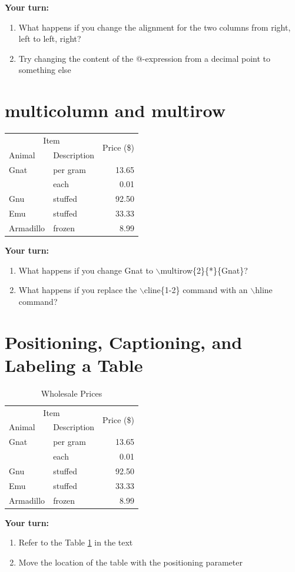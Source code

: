 \documentclass{article}
\begin{document}
{\bf Your turn:}
\begin{enumerate}
\item What happens if you change the alignment for the two columns from right, left to left, right? 
\item Try changing the content of the @-expression from a decimal point to something else
\end{enumerate}
\clearpage
 \section{multicolumn  and multirow}


\begin{tabular}{|l|l|r|} \hline
  \multicolumn{2}{|c|}{Item} & \multirow{2}{*}{Price (\$)}\\ \cline{1-2}
  Animal & Description &  \\ \hline
  Gnat  & per gram & 13.65 \\
        & each     &  0.01 \\
  Gnu   & stuffed  & 92.50 \\
  Emu   & stuffed  & 33.33 \\
  Armadillo & frozen & 8.99 \\ \hline
 \end{tabular}
  
 \bigskip
  
{\bf Your turn:} 
\begin{enumerate}
\item What happens if you change Gnat to ${\backslash}$multirow\{2\}\{*\}\{Gnat\}?
\item What happens if you replace the ${\backslash}$cline\{1-2\} command with an ${\backslash}$hline command?  
\end{enumerate}
\clearpage
\section{Positioning, Captioning, and Labeling a Table}

\begin{table}[H]
\centering
\begin{tabular}{|l|l|r|} \hline
  \multicolumn{2}{|c|}{Item} & \multirow{2}{*}{Price (\$)}\\ \cline{1-2}
  Animal & Description &  \\ \hline
  Gnat  & per gram & 13.65 \\
        & each     &  0.01 \\
  Gnu   & stuffed  & 92.50 \\
  Emu   & stuffed  & 33.33 \\
  Armadillo & frozen & 8.99 \\ \hline
 \end{tabular}
 \caption{\label{tab:prices}Wholesale Prices}
 \end{table}
 \bigskip
  
{\bf Your turn:} 
\begin{enumerate}
\item Refer to the Table \ref{tab:prices} in the text
\item Move the location of the table with the positioning parameter
\end{enumerate}
\clearpage
\end{document}
